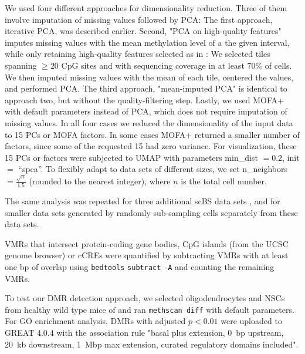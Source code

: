 \documentclass[10pt]{article}
\begin{document}
We used four different approaches for dimensionality reduction. Three of them involve imputation of missing values followed by PCA:
The first approach, iterative PCA, was described earlier.
Second, "PCA on high-quality features" imputes missing values with the mean methylation level of a the given interval, while only retaining high-quality features selected as in \citet{luo2017single}:
We selected tiles spanning $\ge20$ CpG sites and with sequencing coverage in at least 70\% of cells.
We then imputed missing values with the mean of each tile, centered the values, and performed PCA.
The third approach, "mean-imputed PCA" is identical to approach two, but without the quality-filtering step.
Lastly, we used MOFA+ with default parameters instead of PCA, which does not require imputation of missing values. 
In all four cases we reduced the dimensionality of the input data to 15 PCs or MOFA factors. In some cases MOFA+ returned a smaller number of factors, since some of the requested 15 had zero variance.
For visualization, these 15 PCs or factors were subjected to UMAP with parameters min\_dist $=0.2$, init $=$ ``spca''.
To flexibly adapt to data sets of different sizes, we set n\_neighbors  $=\frac{\sqrt{n}}{1.5}$ (rounded to the nearest integer), where $n$ is the total cell number.

The same analysis was repeated for three additional scBS data sets \citep{luo2017single, bian2018single, argelaguet2019gastru}, and for smaller data sets generated by randomly sub-sampling cells separately from these data sets.

VMRs that intersect protein-coding gene bodies, CpG islands (from the UCSC genome browser) or cCREs were quantified by subtracting VMRs with at least one bp of overlap using \texttt{bedtools} \texttt{subtract} \texttt{-A} \citep{quinlan2010bedtools} and counting the remaining VMRs.


To test our DMR detection approach, we selected oligodendrocytes and NSCs from healthy wild type mice of \citet{kremer_scnmt} and ran \texttt{methscan diff} with default parameters.
For GO enrichment analysis, DMRs with adjusted $p<0.01$ were uploaded to GREAT 4.0.4 \citep{mclean2010great} with the association rule "basal plus extension, 0~bp upstream, 20~kb downstream, 1~Mbp max extension, curated regulatory domains included".
\end{document}
